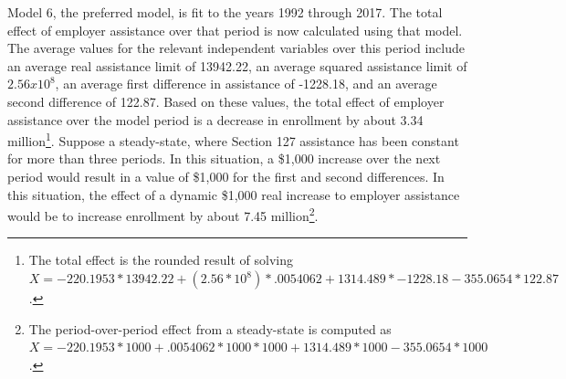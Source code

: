 \documentclass[review]{elsarticle}
\begin{document}
Model 6, the preferred model, is fit to the years 1992 through 2017.
The total effect of employer assistance over that period is now calculated using that model.
The average values for the relevant independent variables over this period include
an average real assistance limit of 13942.22,
an average squared assistance limit of $2.56x10^8$,
an average first difference in assistance of -1228.18,
and an average second difference of 122.87.
Based on these values, the total effect of employer assistance over the model period is
a decrease in enrollment by about 3.34 million\footnote{
    The total effect is the rounded result of solving $X=-220.1953*13942.22+(2.56*10^8)*.0054062+1314.489*-1228.18-355.0654*122.87$.
}.
Suppose a steady-state, where Section 127 assistance has been constant for more than three periods.
In this situation, a \$1,000 increase over the next period would result in a value of \$1,000 for the first and second differences.
In this situation, the effect of a dynamic \$1,000 real increase to employer assistance would be
to increase enrollment by about 7.45 million\footnote{
    The period-over-period effect from a steady-state is computed as $X=-220.1953*1000+.0054062*1000*1000+1314.489*1000-355.0654*1000$.
}.

\end{document}

